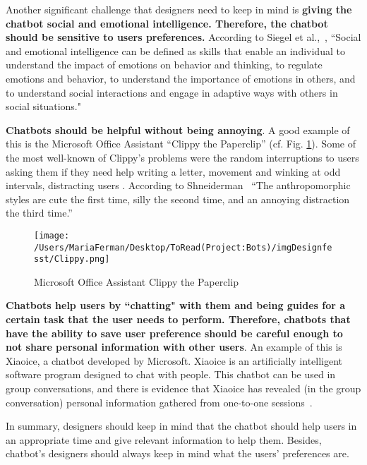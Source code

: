 \documentclass[a4paper,10pt]{article}
\begin{document}
Another significant challenge that designers need to keep in mind is \textbf{giving the chatbot social and emotional intelligence. Therefore, the chatbot should be sensitive to users preferences.} According to Siegel et al.,~\cite{siegel2012pocket}, ``Social and emotional intelligence can be defined as skills that enable an individual to understand the impact of emotions on behavior and thinking, to regulate emotions and behavior, to understand the importance of emotions in others, and to understand social interactions and engage in adaptive ways with others in social situations."

\textbf{Chatbots should be helpful without being annoying}. A good example of this is the Microsoft Office Assistant ``Clippy the Paperclip” (cf. Fig. \ref{FigureClippy}). Some of the most well-known of Clippy's problems were the random interruptions to users asking them if they need help writing a letter, movement and winking at odd intervals, distracting users \cite{Clippy2015}. According to Shneiderman~\cite{shneiderman1995looking} ``The anthropomorphic styles are cute the first time, silly the second time, and an annoying distraction the third time.”

\begin{figure}
\centering
\texttt{[image: /Users/MariaFerman/Desktop/ToRead(Project:Bots)/imgDesignfesst/Clippy.png]}
\caption{Microsoft Office Assistant Clippy the Paperclip}
\label{FigureClippy}
\end{figure}

\textbf{Chatbots help users by ``chatting" with them and being guides for a certain task that the user needs to perform. Therefore, chatbots that have the ability to save user preference should be careful enough to not share personal information with other users}. An example of this is Xiaoice, a chatbot developed by Microsoft. Xiaoice is an artificially intelligent software program designed to chat with people. This chatbot can be used in group conversations, and there is evidence that Xiaoice has revealed (in the group conversation) personal information gathered from one-to-one sessions~\cite{TheChallengeOfDesigningAChatbotWithManners}.     

In summary, designers should keep in mind that the chatbot should help users in an appropriate time and give relevant information to help them. Besides, chatbot's designers should always keep in mind what the users' preferences are. 


   
\end{document}
